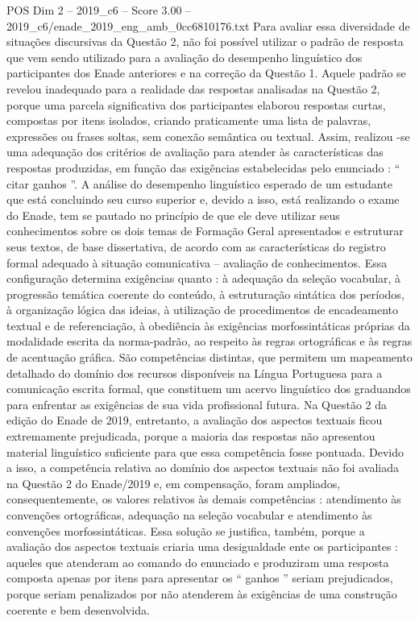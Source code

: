 \begin{textsample}{POS Dim 2 – 2019\_c6 – Score 3.00 – 2019\_c6/enade\_2019\_eng\_amb\_0cc6810176.txt}
Para avaliar essa diversidade de situações discursivas da Questão 2, não foi possível utilizar o padrão de resposta que vem sendo utilizado para a avaliação do desempenho linguístico dos participantes dos Enade anteriores e na correção da Questão 1.
Aquele padrão se revelou inadequado para a realidade das respostas analisadas na Questão 2, porque uma parcela significativa dos participantes elaborou respostas curtas, compostas por itens isolados, criando praticamente uma lista de palavras, expressões ou frases soltas, sem conexão semântica ou textual.
Assim, realizou -se uma adequação dos critérios de avaliação para atender às características das respostas produzidas, em função das exigências estabelecidas pelo enunciado : “ citar ganhos ”.
A análise do desempenho linguístico esperado de um estudante que está concluindo seu curso superior e, devido a isso, está realizando o exame do Enade, tem se pautado no princípio de que ele deve utilizar seus conhecimentos sobre os dois temas de Formação Geral apresentados e estruturar seus textos, de base dissertativa, de acordo com as características do registro formal adequado à situação comunicativa – avaliação de conhecimentos.
Essa configuração determina exigências quanto : à adequação da seleção vocabular, à progressão temática coerente do conteúdo, à estruturação sintática dos períodos, à organização lógica das ideias, à utilização de procedimentos de encadeamento textual e de referenciação, à obediência às exigências morfossintáticas próprias da modalidade escrita da norma-padrão, ao respeito às regras ortográficas e às regras de acentuação gráfica.
São competências distintas, que permitem um mapeamento detalhado do domínio dos recursos disponíveis na Língua Portuguesa para a comunicação escrita formal, que constituem um acervo linguístico dos graduandos para enfrentar as exigências de sua vida profissional futura.
Na Questão 2 da edição do Enade de 2019, entretanto, a avaliação dos aspectos textuais ficou extremamente prejudicada, porque a maioria das respostas não apresentou material linguístico suficiente para que essa competência fosse pontuada.
Devido a isso, a competência relativa ao domínio dos aspectos textuais não foi avaliada na Questão 2 do Enade/2019 e, em compensação, foram ampliados, consequentemente, os valores relativos às demais competências : atendimento às convenções ortográficas, adequação na seleção vocabular e atendimento às convenções morfossintáticas.
Essa solução se justifica, também, porque a avaliação dos aspectos textuais criaria uma desigualdade ente os participantes : aqueles que atenderam ao comando do enunciado e produziram uma resposta composta apenas por itens para apresentar os “ ganhos ” seriam prejudicados, porque seriam penalizados por não atenderem às exigências de uma construção coerente e bem desenvolvida.

\end{textsample}
